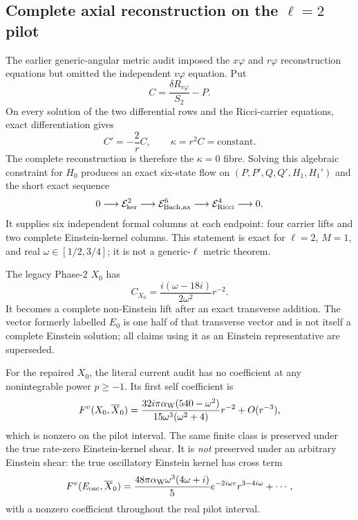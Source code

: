 \documentclass[11pt]{article}
\theoremstyle{definition}
\theoremstyle{remark}
\begin{document}
\subsection{Complete axial reconstruction on the \texorpdfstring{\(\ell=2\)}{ell=2} pilot}

The earlier generic-angular metric audit imposed the \(x\varphi\) and
\(r\varphi\) reconstruction equations but omitted the independent
\(v\varphi\) equation.  Put
\begin{equation}
 C=\frac{\delta R_{v\varphi}}{S_2}-P .
\end{equation}
On every solution of the two differential rows and the Ricci-carrier
equations, exact differentiation gives
\begin{equation}
 C'=-\frac2r C,
 \qquad \kappa=r^2C=\text{constant}.
\end{equation}
The complete reconstruction is therefore the \(\kappa=0\) fibre.  Solving
this algebraic constraint for \(H_0\) produces an exact six-state flow on
\((P,P',Q,Q',H_1,H_1')\) and the short exact sequence
\begin{equation}
 0\longrightarrow\mathcal E_{\rm ker}^{2}
 \longrightarrow\mathcal E_{\rm Bach,ax}^{6}
 \longrightarrow\mathcal E_{\rm Ricci}^{4}
 \longrightarrow0 .
\end{equation}
It supplies six independent formal columns at each endpoint: four carrier
lifts and two complete Einstein-kernel columns.  This statement is exact for
\(\ell=2\), \(M=1\), and real \(\omega\in[1/2,3/4]\); it is not a
generic-\(\ell\) metric theorem.

The legacy Phase-2 \(X_0\) has
\begin{equation}
 C_{X_0}=\frac{i(\omega-18i)}{2\omega^2}r^{-2}.
\end{equation}
It becomes a complete non-Einstein lift after an exact transverse addition.
The vector formerly labelled \(E_0\) is one half of that transverse vector
and is not itself a complete Einstein solution; all claims using it as an
Einstein representative are superseded.

For the repaired \(X_0\), the literal current audit has no coefficient at
any nonintegrable power \(p\ge-1\).  Its first self coefficient is
\begin{equation}
 F^v(X_0,\overline X_0)=
 \frac{32i\pi\alpha_{\rm W}(540-\omega^2)}
 {15\omega^3(\omega^2+4)}r^{-2}+O(r^{-3}),
\end{equation}
which is nonzero on the pilot interval.  The same finite class is preserved
under the true rate-zero Einstein-kernel shear.  It is \emph{not} preserved
under an arbitrary Einstein shear: the true oscillatory Einstein kernel has
cross term
\begin{equation}
 F^v(E_{\rm osc},\overline X_0)=
 \frac{48\pi\alpha_{\rm W}\omega^3(4\omega+i)}5
 e^{-2i\omega r}r^{3-4i\omega}+\cdots,
\end{equation}
with a nonzero coefficient throughout the real pilot interval.
\end{document}

